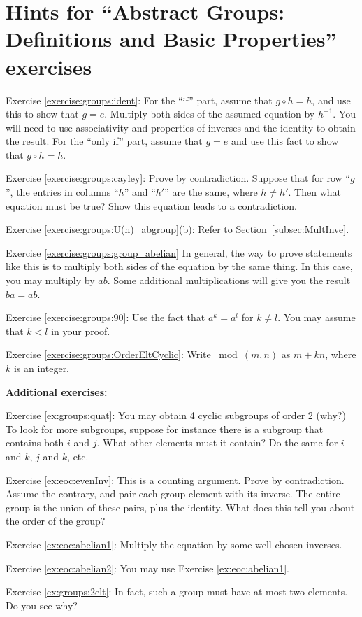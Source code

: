 \section{Hints for ``Abstract Groups: Definitions and Basic Properties'' exercises}\label{sec:groups:hints}

\noindent Exercise \ref{exercise:groups:ident}: For the ``if'' part, assume that $g \circ h = h$, and use this to show that $g = e$. Multiply both sides of the assumed equation by $h^{-1}$. You will need to use associativity and properties of inverses and the identity to obtain the result.  For the ``only if'' part, assume that $g=e$ and use this fact to show that $g \circ h = h$.

\noindent Exercise \ref{exercise:groups:cayley}: Prove by contradiction. Suppose that for row ``$g$'', the entries in columns ``$h$'' and ``$h'$'' are the same, where $h \neq h'$.  Then what equation must be true? Show this equation leads to a contradiction.

\noindent Exercise \ref{exercise:groups:U(n)_abgroup}(b): Refer to Section~\ref{subsec:MultInve}.

\noindent Exercise \ref{exercise:groups:group_abelian} In general, the way to prove statements like this is to multiply both sides of the equation by the same thing.  In this case, you may multiply by $ab$.  Some additional multiplications will give you the result $ba=ab$.

\noindent Exercise \ref{exercise:groups:90}: Use the fact that $a^k = a^l$ for $k \neq l$.  You may assume that $k < l$ in your proof.

\noindent Exercise \ref{exercise:groups:OrderEltCyclic}: Write $\bmod(m,n)$ as $m + kn$, where $k$ is an integer.

\bigskip

\textbf{Additional exercises:}

\noindent Exercise \ref{ex:groups:quat}: You may obtain 4 cyclic subgroups of order 2 (why?)  To look for more subgroups, suppose for instance there is a subgroup that contains both $i$ and $j$.  What other elements must it contain?  Do the same for $i$ and $k$, $j$ and $k$, etc.

\noindent Exercise \ref{ex:eoc:evenInv}: This is a counting argument. Prove by contradiction. Assume the contrary, and pair each group element with its inverse. The entire group is the union of these pairs, plus the identity. What does this tell you about the order of the group?

\noindent Exercise \ref{ex:eoc:abelian1}: Multiply the equation by some well-chosen inverses.

\noindent Exercise \ref{ex:eoc:abelian2}: You may use Exercise \ref{ex:eoc:abelian1}.

\noindent Exercise \ref{ex:groups:2elt}: In fact, such a group must have at most two elements. Do you see why?


